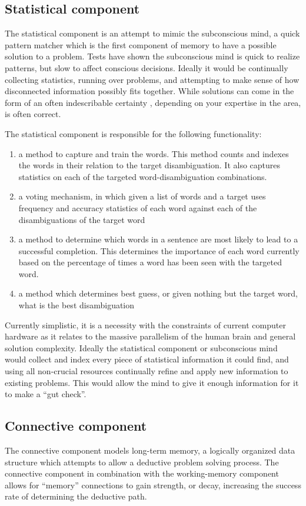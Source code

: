 \subsection{Statistical component}
The statistical component is an attempt to mimic the subconscious mind, a quick pattern matcher which is the first component of memory to have a possible solution to a problem.  Tests have shown \cite{BLINK} the subconscious mind is quick to realize patterns, but slow to affect conscious decisions. Ideally it would be continually collecting statistics, running over problems, and attempting to make sense of how disconnected information possibly fits together.  While solutions can come in the form of an often indescribable certainty \cite{BLINK}, depending on your expertise in the area, is often correct.

The statistical component is responsible for the following functionality:

\begin{enumerate}
	\item a method to capture and train the words.  This method counts and indexes the words in their relation to the target disambiguation. It also captures statistics on each of the targeted word-disambiguation combinations.
	\item a voting mechanism, in which given a list of words and a target uses frequency and accuracy statistics of each word against each of the disambiguations of the target word
	\item a method to determine which words in a sentence are most likely to lead to a successful completion.  This determines the importance of each word currently based on the percentage of times a word has been seen with the targeted word.
	\item a method which determines best guess, or given nothing but the target word, what is the best disambiguation
\end{enumerate}

Currently simplistic, it is a necessity with the constraints of current computer hardware as it relates to the massive parallelism of the human brain and general solution complexity.  Ideally the statistical component or subconscious mind would collect and index every piece of statistical information it could find, and using all non-crucial resources continually refine and apply new information to existing problems.  This would allow the mind to give it enough information for it to make a ``gut check''.

\subsection{Connective component}
The connective component models long-term memory, a logically organized data structure which attempts to allow a deductive problem solving process.  The connective component in combination with the working-memory component allows for ``memory'' connections to gain strength, or decay, increasing the success rate of determining the deductive path.  


